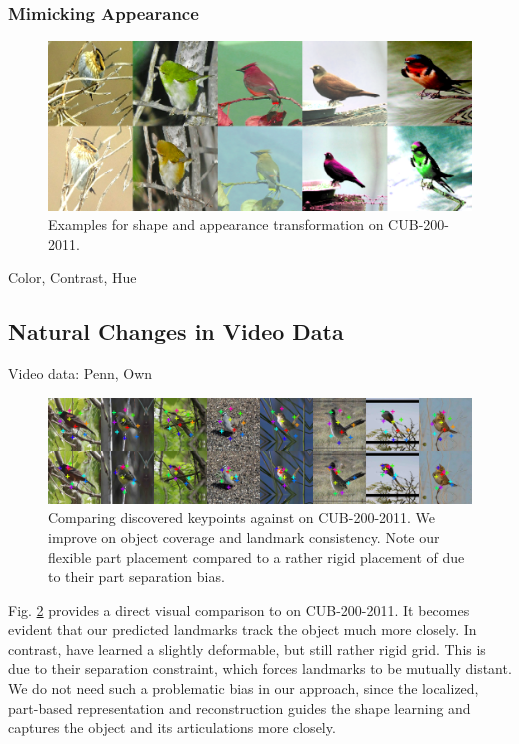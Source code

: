 	\subsubsection{Mimicking Appearance}

	\begin{figure}[htp]
		\centering
		\includegraphics[trim={0cm 0cm 0cm 0cm},clip, width=.8\linewidth]{fig/shape/coloraugm}
		\caption{Examples for shape and appearance transformation on CUB-200-2011.}
		\label{fig:compare}
	\end{figure}


	Color, Contrast, Hue
	\subsection{Natural Changes in Video Data}
	Video data: Penn, Own
	\begin{figure}[htp]
		\centering
		\includegraphics[trim={0cm 0cm 0cm 0cm},clip, width=1.\linewidth]{fig/shape/comp}
		\caption{Comparing discovered keypoints against \cite{zhang18} on CUB-200-2011. We improve on object coverage and landmark consistency. Note our flexible part placement compared to a rather rigid placement of \cite{zhang18} due to their part separation bias.}
		\label{fig:compare}
	\end{figure}

	Fig. \ref{fig:compare} provides a direct visual comparison to \cite{zhang18} on CUB-200-2011. It becomes evident that our predicted landmarks track the object much more closely. In contrast, \cite{zhang18} have learned a slightly deformable, but still rather rigid grid.
	This is due to their separation constraint, which forces landmarks to be mutually distant. We do not need such a problematic bias in our approach, since the localized, part-based representation and reconstruction guides the shape learning and captures the object and its articulations more closely.



